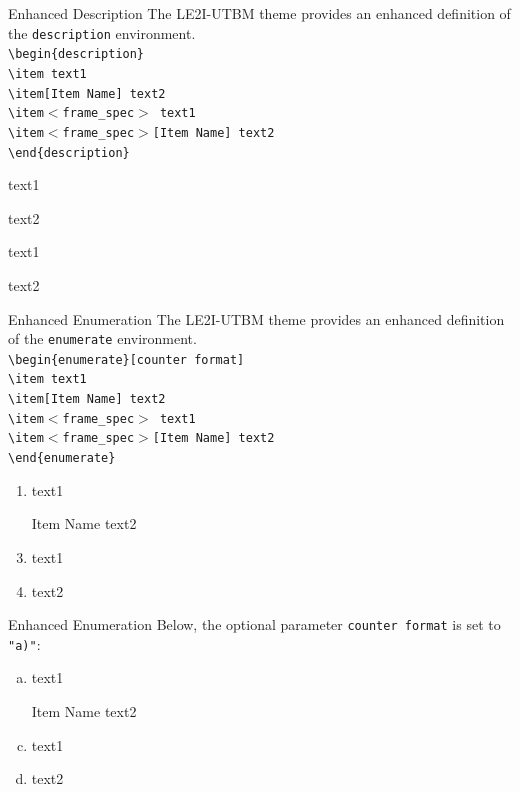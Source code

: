 \documentclass[english,sectioncirclenumberstyle]{le2iutbmbeamer}
\begin{document}
\begin{frame}{Enhanced Description}
	The LE2I-UTBM theme provides an enhanced definition of the \texttt{description} environment. \\[.5cm]
	{\smaller
	\texttt{{\textbackslash}begin\{description\}} \\
	\texttt{{\textbackslash}item text1} \\
	\texttt{{\textbackslash}item[Item Name] text2} \\
	\texttt{{\textbackslash}item$<$frame\_spec$>$ text1} \\
	\texttt{{\textbackslash}item$<$frame\_spec$>$[Item Name] text2} \\
	\texttt{{\textbackslash}end\{description\}}} \\[.5cm]
	\begin{description}
	\item text1
	\item[Item Name] text2
	\item<2> text1
	\item<2>[Item Name] text2
	\end{description}
\end{frame}

\begin{frame}{Enhanced Enumeration}
	The LE2I-UTBM theme provides an enhanced definition of the \texttt{enumerate} environment. \\[.5cm]
	{\smaller
	\texttt{{\textbackslash}begin\{enumerate\}[counter format]} \\
	\texttt{{\textbackslash}item text1} \\
	\texttt{{\textbackslash}item[Item Name] text2} \\
	\texttt{{\textbackslash}item$<$frame\_spec$>$ text1} \\
	\texttt{{\textbackslash}item$<$frame\_spec$>$[Item Name] text2} \\
	\texttt{{\textbackslash}end\{enumerate\}}} \\[.5cm]
	\begin{enumerate}
	\item text1
	\item[Item Name] text2
	\item<2> text1
	\item<2>[Item Name] text2
	\end{enumerate}
\end{frame}

\begin{frame}{Enhanced Enumeration \insertcontinuationtext}
	Below, the optional parameter \texttt{counter format} is set to \texttt{"a)"}: \\[.5cm]
	\begin{enumerate}[a)]
	\item text1
	\item[Item Name] text2
	\item<2> text1
	\item<2>[Item Name] text2
	\end{enumerate}
\end{frame}
\end{document}
